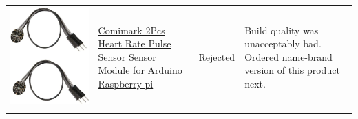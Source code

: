 \documentclass[12pt, titlepage]{article}
\begin{document}
\begin{table}[H]
\begin{tabular}{ | c | m{3cm} | c | m{7cm} |}
    \includegraphics[scale = 0.1]{knockoff}     & \href{https://www.amazon.ca/Comimark-Sensor-Module-Arduino-Raspberry/dp/B07V6VV8CM}{Comimark 2Pcs Heart Rate Pulse Sensor Sensor Module for Arduino Raspberry pi} & Rejected        & Build quality was unacceptably bad. Ordered name-brand version of this product next.                                                                                                                                                                                     \\                                                                                              \\
    \hline
  \end{tabular}
\end{table}
\end{document}
